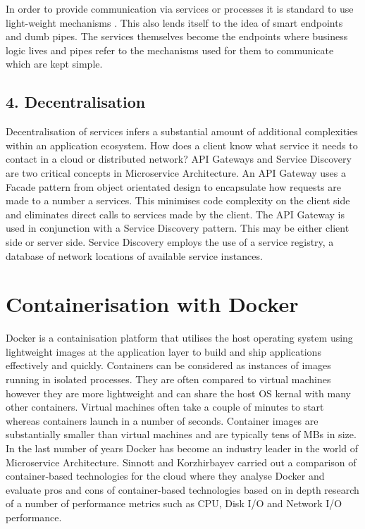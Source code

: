 In order to provide communication via services or processes it is standard to use light-weight mechanisms \cite{MicroservicesYesterdayTodayTomorrow}. This also lends itself to the idea of smart endpoints and dumb pipes\cite{MicroservicesResourceGuide}. The services themselves become the endpoints where business logic lives and pipes refer to the mechanisms used for them to communicate which are kept simple.

\subsection*{ 4. Decentralisation }
Decentralisation of services infers a substantial amount of additional complexities within an application ecosystem. How does a client know what service it needs to contact in a cloud or distributed network? API Gateways\cite{APIGateways} and Service Discovery\cite{ServiceDiscovery} are two critical concepts in Microservice Architecture. An API Gateway uses a Facade pattern\cite{Gamma:1995:DPE:186897} from object orientated design to encapsulate how requests are made to a number a services. This minimises code complexity on the client side and eliminates direct calls to services made by the client. The API Gateway is used in conjunction with a Service Discovery pattern. This may be either client side or server side. Service Discovery employs the use of a service registry, a database of network locations of available service instances\cite{ServiceDiscovery}.

\section{Containerisation with Docker}
Docker \cite{Docker} is a containisation platform that utilises the host operating system using lightweight images at the application layer to build and ship applications effectively and quickly. Containers can be considered as instances of images  running in isolated processes. They are often compared to virtual machines however they are more lightweight and can share the host OS kernal with many other containers. Virtual machines often take a couple of minutes to start whereas containers launch in a number of seconds. Container images are substantially smaller than virtual machines and are typically tens of MBs in size. In the last number of years Docker has become an industry leader in the world of Microservice Architecture. Sinnott and Korzhirbayev carried out a comparison of container-based technologies for the cloud\cite{KOZHIRBAYEV2017175} where they analyse Docker and evaluate pros and cons of container-based technologies based on in depth research of a number of performance metrics such as CPU, Disk I/O and Network I/O performance.

